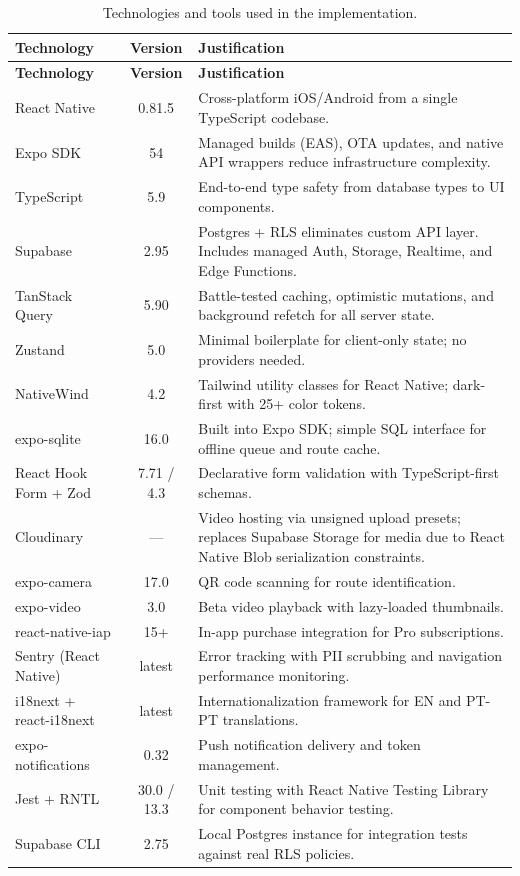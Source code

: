 \documentclass[12pt,a4paper]{report}
\renewcommand\_{\textunderscore\hspace{0pt}}
\begin{document}
\begin{longtable}{>{\raggedright\arraybackslash}p{4.5cm} c >{\raggedright\arraybackslash}p{7cm}}
\caption{Technologies and tools used in the implementation.}\label{tab:tech-stack}\\
\hline
\textbf{Technology} & \textbf{Version} & \textbf{Justification} \\
\hline
\endfirsthead
\hline
\textbf{Technology} & \textbf{Version} & \textbf{Justification} \\
\hline
\endhead

React Native & 0.81.5 & Cross-platform iOS/Android from a single TypeScript codebase. \\
Expo SDK & 54 & Managed builds (EAS), OTA updates, and native API wrappers reduce infrastructure complexity. \\
TypeScript & 5.9 & End-to-end type safety from database types to UI components. \\
Supabase & 2.95 & Postgres + RLS eliminates custom API layer. Includes managed Auth, Storage, Realtime, and Edge Functions. \\
TanStack Query & 5.90 & Battle-tested caching, optimistic mutations, and background refetch for all server state. \\
Zustand & 5.0 & Minimal boilerplate for client-only state; no providers needed. \\
NativeWind & 4.2 & Tailwind utility classes for React Native; dark-first with 25+ color tokens. \\
expo-sqlite & 16.0 & Built into Expo SDK; simple SQL interface for offline queue and route cache. \\
React Hook Form + Zod & 7.71 / 4.3 & Declarative form validation with TypeScript-first schemas. \\
Cloudinary & --- & Video hosting via unsigned upload presets; replaces Supabase Storage for media due to React Native Blob serialization constraints. \\
expo-camera & 17.0 & QR code scanning for route identification. \\
expo-video & 3.0 & Beta video playback with lazy-loaded thumbnails. \\
react-native-iap & 15+ & In-app purchase integration for Pro subscriptions. \\
Sentry (React Native) & latest & Error tracking with PII scrubbing and navigation performance monitoring. \\
i18next + react-i18next & latest & Internationalization framework for EN and PT-PT translations. \\
expo-notifications & 0.32 & Push notification delivery and token management. \\
Jest + RNTL & 30.0 / 13.3 & Unit testing with React Native Testing Library for component behavior testing. \\
Supabase CLI & 2.75 & Local Postgres instance for integration tests against real RLS policies. \\
\hline
\end{longtable}
\end{document}

